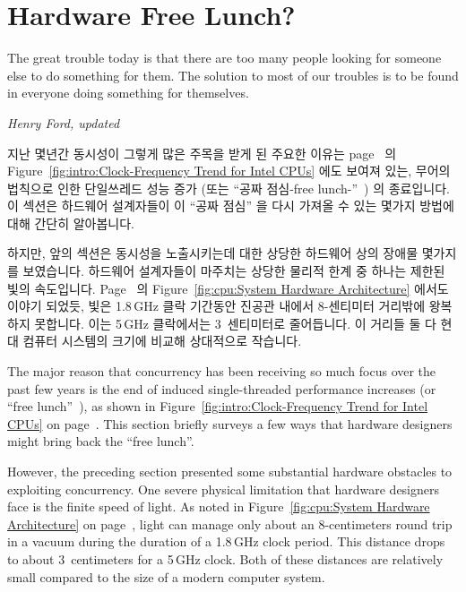 
\section{Hardware Free Lunch?}
\label{sec:cpu:Hardware Free Lunch?}
%
\epigraph{The great trouble today is that there are too many people looking
	  for someone else to do something for them.
	  The solution to most of our troubles is to be found in everyone
	  doing something for themselves.}
	 {\emph{Henry Ford, updated}}

지난 몇년간 동시성이 그렇게 많은 주목을 받게 된 주요한 이유는
page~\pageref{fig:intro:Clock-Frequency Trend for Intel CPUs} 의
Figure~\ref{fig:intro:Clock-Frequency Trend for Intel CPUs}
에도 보여져 있는, 무어의 법칙으로 인한 단일쓰레드 성능 증가 (또는 ``공짜
점심-free lunch-''~\cite{HerbSutter2008EffectiveConcurrency}) 의 종료입니다.
이 섹션은 하드웨어 설계자들이 이 ``공짜 점심'' 을 다시 가져올 수 있는 몇가지
방법에 대해 간단히 알아봅니다.

하지만, 앞의 섹션은 동시성을 노출시키는데 대한 상당한 하드웨어 상의 장애물
몇가지를 보였습니다.
하드웨어 설계자들이 마주치는 상당한 물리적 한계 중 하나는 제한된 빛의
속도입니다.
Page~\pageref{fig:cpu:System Hardware Architecture} 의
Figure~\ref{fig:cpu:System Hardware Architecture}
에서도 이야기 되었듯, 빛은 1.8\,GHz 클락 기간동안 진공관 내에서 8-센티미터
거리밖에 왕복하지 못합니다.
이는 5\,GHz 클락에서는 3~센티미터로 줄어듭니다.
이 거리들 둘 다 현대 컴퓨터 시스템의 크기에 비교해 상대적으로 작습니다.

\iffalse

The major reason that concurrency has been receiving so much focus over
the past few years is the end of 
induced single-threaded
performance increases
(or ``free lunch''~\cite{HerbSutter2008EffectiveConcurrency}),
as shown in
Figure~\ref{fig:intro:Clock-Frequency Trend for Intel CPUs} on
page~\pageref{fig:intro:Clock-Frequency Trend for Intel CPUs}.
This section briefly surveys a few ways that hardware designers
might bring back the ``free lunch''.

However, the preceding section presented some substantial hardware
obstacles to exploiting concurrency.
One severe physical limitation that hardware designers face is the
finite speed of light.
As noted in
Figure~\ref{fig:cpu:System Hardware Architecture} on
page~\pageref{fig:cpu:System Hardware Architecture},
light can manage only about an 8-centimeters round trip in a vacuum
during the duration of a 1.8\,GHz clock period.
This distance drops to about 3~centimeters for a 5\,GHz clock.
Both of these distances are relatively small compared to the size
of a modern computer system.

